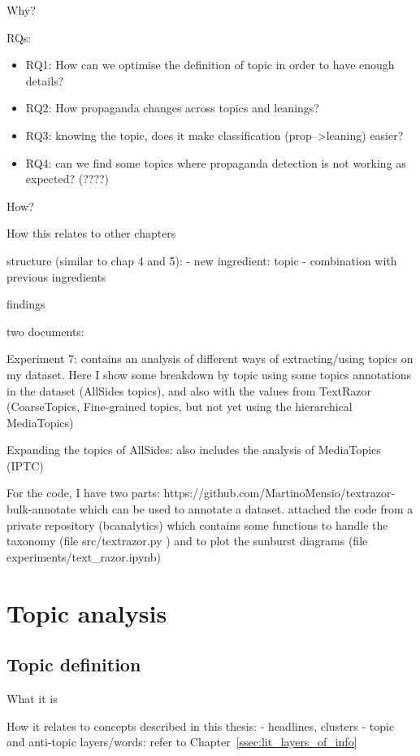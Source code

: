Why?


RQs:
\begin{itemize}
    \item RQ1: How can we optimise the definition of topic in order to have enough details?
    \item RQ2: How propaganda changes across topics and leanings?
    \item RQ3: knowing the topic, does it make classification (prop-->leaning) easier?
    \item RQ4: can we find some topics where propaganda detection is not working as expected? (????)
\end{itemize}

How?

How this relates to other chapters


structure (similar to chap 4 and 5):
- new ingredient: topic
- combination with previous ingredients

findings


two documents:

Experiment 7: contains an analysis of different ways of extracting/using topics on my dataset. Here I show some breakdown by topic using some topics annotations in the dataset (AllSides topics), and also with the values from TextRazor (CoarseTopics, Fine-grained topics, but not yet using the hierarchical MediaTopics)

Expanding the topics of AllSides: also includes the analysis of MediaTopics (IPTC)


For the code, I have two parts:
https://github.com/MartinoMensio/textrazor-bulk-annotate which can be used to annotate a dataset.
attached the code from a private repository (bcanalytics) which contains some functions to handle the taxonomy (file src/textrazor.py ) and to plot the sunburst diagrams (file experiments/text\_razor.ipynb)

\section{Topic analysis}

\subsection{Topic definition}

What it is

How it relates to concepts described in this thesis:
- headlines, clusters
- topic and anti-topic layers/words: refer to Chapter~\ref{ssec:lit_layers_of_info}

